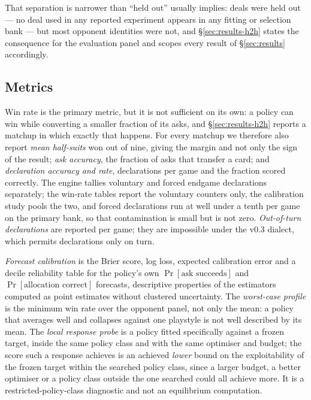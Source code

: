\documentclass[11pt]{article}
\theoremstyle{definition}
\begin{document}
That separation is narrower than ``held out'' usually implies: deals were held
out --- no deal used in any reported experiment appears in any fitting or
selection bank --- but most opponent identities were not, and
\S\ref{sec:results-h2h} states the consequence for the evaluation panel and
scopes every result of \S\ref{sec:results} accordingly.

\subsection{Metrics}
\label{sec:protocol-metrics}

Win rate is the primary metric, but it is not sufficient on its own: a policy
can win while converting a smaller fraction of its asks, and
\S\ref{sec:results-h2h} reports a matchup in which exactly that happens. For
every matchup we therefore also report \emph{mean half-suits} won out of nine,
giving the margin and not only the sign of the result; \emph{ask accuracy},
the fraction of asks that transfer a card; and \emph{declaration accuracy and
rate}, declarations per game and the fraction scored correctly. The engine
tallies voluntary and forced endgame declarations separately; the win-rate
tables report the voluntary counters only, the calibration study pools the
two, and forced declarations run at well under a tenth per game on the primary
bank, so that contamination is small but is not zero. \emph{Out-of-turn
declarations} are reported per game; they are impossible under the v0.3
dialect, which permits declarations only on turn.

\emph{Forecast calibration} is the Brier score, log loss, expected calibration
error and a decile reliability table for the policy's own $\Pr[\text{ask
succeeds}]$ and $\Pr[\text{allocation correct}]$ forecasts, descriptive
properties of the estimators computed as point estimates without clustered
uncertainty. The \emph{worst-case profile} is the minimum win rate over the
opponent panel, not only the mean: a policy that averages well and collapses
against one playstyle is not well described by its mean. The \emph{local
response probe} is a policy fitted specifically against a frozen target,
inside the same policy class and with the same optimiser and budget; the score
such a response achieves is an achieved \emph{lower} bound on the
exploitability of the frozen target within the searched policy class, since a
larger budget, a better optimiser or a policy class outside the one searched
could all achieve more. It is a restricted-policy-class diagnostic and not an
equilibrium computation.
\end{document}
